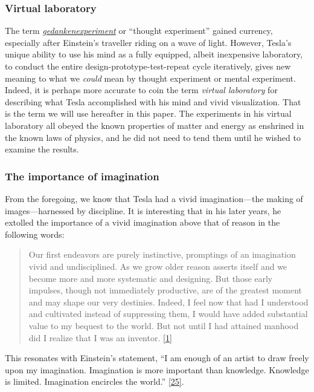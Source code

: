 \documentclass[
  a4paper,
]{article}
\begin{document}
\hypertarget{virtual-laboratory}{%
\subsubsection{Virtual laboratory}\label{virtual-laboratory}}

The term
\href{https://www.britannica.com/science/Gedankenexperiment}{\emph{gedankenexperiment}}
or ``thought experiment'' gained currency, especially after Einstein's
traveller riding on a wave of light. However, Tesla's unique ability to
use his mind as a fully equipped, albeit inexpensive laboratory, to
conduct the entire design-prototype-test-repeat cycle iteratively, gives
new meaning to what we \emph{could} mean by thought experiment or mental
experiment. Indeed, it is perhaps more accurate to coin the term
\emph{virtual laboratory} for describing what Tesla accomplished with
his mind and vivid visualization. That is the term we will use hereafter
in this paper. The experiments in his virtual laboratory all obeyed the
known properties of matter and energy as enshrined in the known laws of
physics, and he did not need to tend them until he wished to examine the
results.

\hypertarget{the-importance-of-imagination}{%
\subsubsection{The importance of
imagination}\label{the-importance-of-imagination}}

From the foregoing, we know that Tesla had a vivid imagination---the
making of images---harnessed by discipline. It is interesting that in
his later years, he extolled the importance of a vivid imagination above
that of reason in the following words:

\begin{quote}
Our first endeavors are purely instinctive, promptings of an imagination
vivid and undisciplined. As we grow older reason asserts itself and we
become more and more systematic and designing. But those early impulses,
though not immediately productive, are of the greatest moment and may
shape our very destinies. Indeed, I feel now that had I understood and
cultivated instead of suppressing them, I would have added substantial
value to my bequest to the world. But not until I had attained manhood
did I realize that I was an inventor.
\protect\hyperlink{ref-john83}{{[}1{]}}
\end{quote}

This resonates with Einstein's statement, ``I am enough of an artist to
draw freely upon my imagination. Imagination is more important than
knowledge. Knowledge is limited. Imagination encircles the world.''
\protect\hyperlink{ref-einstein-quote}{{[}25{]}}.
\end{document}
